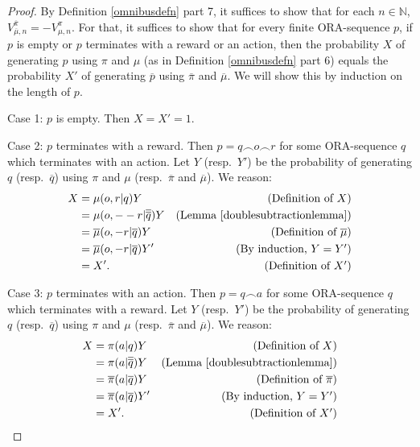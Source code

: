 \documentclass{article}
\begin{document}
\begin{proof}
    By Definition \ref{omnibusdefn} part 7,
    it suffices to show that for each $n\in\mathbb N$,
    $V^{\overline \pi}_{\overline \mu,n}=-V^\pi_{\mu,n}$.
    For that, it suffices to show that for every finite ORA-sequence
    $p$, if $p$ is empty or $p$ terminates with a reward or an action, then
    the probability $X$ of generating $p$ using $\pi$ and $\mu$
    (as in Definition \ref{omnibusdefn} part 6)
    equals the probability $X'$ of generating $\overline p$
    using $\overline \pi$ and $\overline \mu$.
    We will show this by induction on the length of $p$.

    Case 1: $p$ is empty. Then $X=X'=1$.

    Case 2: $p$ terminates with a reward.
    Then $p=q\frown o \frown r$
    for some ORA-sequence $q$ which terminates with an action.
    Let $Y$ (resp.\ $Y'$) be the probability of generating $q$
    (resp.\ $\overline q$)
    using $\pi$ and $\mu$ (resp.\ $\overline \pi$ and $\overline \mu$). We reason:
    \begin{align*}
        X &= \mu(o,r|q)Y
            &\mbox{(Definition of $X$)}\\
          &= \mu(o,--r| \overline{\overline q})Y
            &\mbox{(Lemma \ref{doublesubtractionlemma})}\\
          &= \overline \mu(o,-r| \overline q)Y
            &\mbox{(Definition of $\overline\mu$)}\\
          &= \overline \mu(o,-r| \overline q)Y'
            &\mbox{(By induction, $Y=Y'$)}\\
          &= X'. &\mbox{(Definition of $X'$)}
    \end{align*}

    Case 3: $p$ terminates with an action.
    Then $p=q\frown a$ for some ORA-sequence $q$ which terminates with a reward.
    Let $Y$ (resp.\ $Y'$) be the probability of generating $q$
    (resp.\ $\overline q$)
    using $\pi$ and $\mu$ (resp.\ $\overline\pi$ and $\overline\mu$). We reason:
    \begin{align*}
        X &= \pi(a|q)Y
            &\mbox{(Definition of $X$)}\\
          &= \pi(a|\overline{\overline q})Y
            &\mbox{(Lemma \ref{doublesubtractionlemma})}\\
          &= \overline \pi(a|\overline q)Y
            &\mbox{(Definition of $\overline \pi$)}\\
          &= \overline \pi(a|\overline q)Y'
            &\mbox{(By induction, $Y=Y'$)}\\
          &= X'. &\mbox{(Definition of $X'$)}
    \end{align*}
\end{proof}
\end{document}
